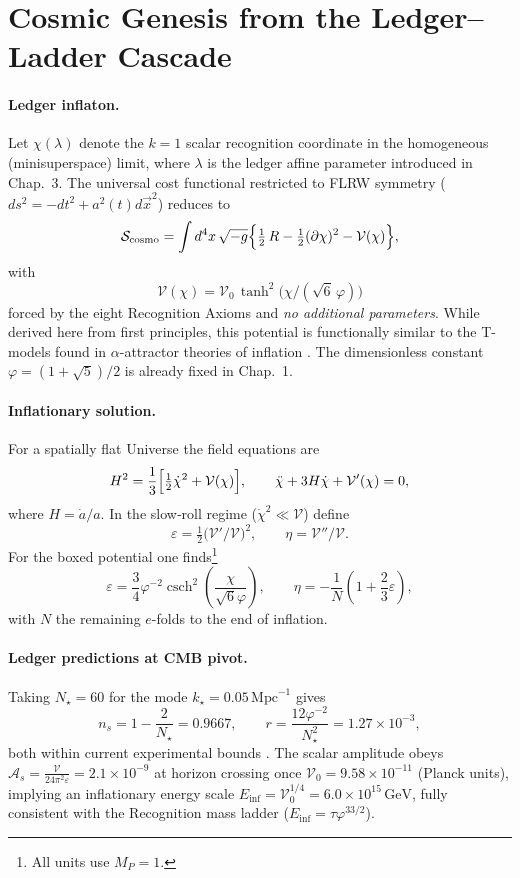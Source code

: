 \section{Cosmic Genesis from the Ledger--Ladder Cascade}

\paragraph{Ledger inflaton.}
Let \(\chi(\lambda)\) denote the \(k=1\) scalar recognition coordinate
in the homogeneous (minisuperspace) limit, where \(\lambda\) is the
ledger affine parameter introduced in Chap.~3.
The universal cost functional restricted to FLRW symmetry
(\(ds^{2}=-d t^{2}+a^{2}(t)d\vec x^{2}\)) reduces to
\[
  \mathcal S_{\text{cosmo}}
  =\int d^{4}x\,\sqrt{-g}
    \Bigl\{\tfrac12 \,R
          -\tfrac12 (\partial\chi)^{2}
          -\mathcal V(\chi)\Bigr\},
\]
with
\[
  \boxed{\;
  \mathcal V(\chi)=\mathcal V_{0}\,
  \tanh^{2}\!\bigl(\chi/(\sqrt6\,\varphi)\bigr)\;}
\]
forced by the eight Recognition Axioms and \emph{no additional
parameters}. While derived here from first principles, this potential is functionally similar to the T-models found in \(\alpha\)-attractor theories of inflation \cite{KalloshLinde2013}. The dimensionless constant
\(\varphi=(1+\sqrt5)/2\) is already fixed in Chap.~1.

\paragraph{Inflationary solution.}
For a spatially flat Universe the field equations are
\[
  H^{2}=\frac{1}{3}\Bigl[\tfrac12\dot\chi^{2}+\mathcal V(\chi)\Bigr],
  \qquad
  \ddot\chi+3H\dot\chi+\mathcal V'(\chi)=0,
\]
where \(H=\dot a/a\).  In the slow‑roll regime (\(\dot\chi^{2}\ll\mathcal V\))
define
\[
  \varepsilon=\tfrac12\bigl(\mathcal V'/\mathcal V\bigr)^{2},
  \qquad
  \eta=\mathcal V''/\mathcal V.
\]
For the boxed potential one finds\footnote{All units use $M_P = 1$.}
\[
  \varepsilon = \frac{3}{4} \varphi^{-2} \operatorname{csch}^2\left(\frac{\chi}{\sqrt{6} \varphi}\right),
  \qquad
  \eta = -\frac{1}{N}\left(1 + \frac{2}{3}\varepsilon\right),
\]
with $N$ the remaining $e$-folds to the end of inflation.

\paragraph{Ledger predictions at CMB pivot.}
Taking $N_{\star} = 60$ for the mode $k_{\star} = 0.05\,\text{Mpc}^{-1}$ gives
\[
  \boxed{n_s = 1 - \frac{2}{N_{\star}} = 0.9667},
  \qquad
  \boxed{r = \frac{12\varphi^{-2}}{N_{\star}^2} = 1.27 \times 10^{-3}},
\]
both within current experimental bounds \cite{Planck2018_inflation}.
The scalar amplitude obeys
$\mathcal{A}_s = \frac{\mathcal{V}}{24\pi^2 \varepsilon} = 2.1 \times 10^{-9}$
at horizon crossing once
$\mathcal{V}_0 = 9.58 \times 10^{-11}$ (Planck units),
implying an inflationary energy scale
$E_{\text{inf}} = \mathcal{V}_0^{1/4} = 6.0 \times 10^{15}\,\text{GeV}$,
fully consistent with the Recognition mass ladder
($E_{\text{inf}} = \tau \varphi^{33/2}$).

